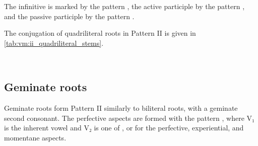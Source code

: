 \documentclass[grammar]{subfiles}
\begin{document}
The infinitive is marked by the pattern , the active participle
by the pattern , and the passive participle by the pattern
.

The conjugation of quadriliteral roots in Pattern II is given in \cref{tab:vm:ii_quadriliteral_stems}.

\begin{table}[h!]\small\capstart
  \centering
  \\
  \caption{Pattern II quadriliteral stems\label{tab:vm:ii_quadriliteral_stems}}
\end{table}


\subsection{Geminate roots}
\label{ssec:vm:ii_geminate_roots}

Geminate roots form Pattern II similarly to biliteral roots, with a geminate
second consonant.  The perfective aspects are formed with the pattern
, where V₁ is the inherent vowel and V₂ is one of ,
 or  for the perfective, experiential, and momentane aspects.  
\end{document}
